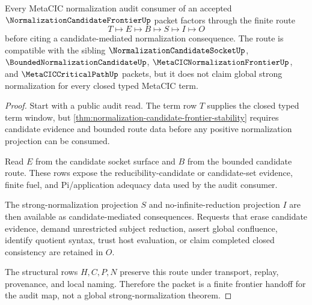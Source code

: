 \begin{theorem}
\label{thm:normalization-candidate-frontier-audit-handoff}
Every MetaCIC normalization audit consumer of an accepted $\NormalizationCandidateFrontierUp$ packet factors through the finite route
$$
T \longmapsto E \longmapsto B \longmapsto S \longmapsto I \longmapsto O
$$
before citing a candidate-mediated normalization consequence. The route is compatible with the sibling $\NormalizationCandidateSocketUp$, $\BoundedNormalizationCandidateUp$, $\MetaCICNormalizationFrontierUp$, and $\MetaCICCriticalPathUp$ packets, but it does not claim global strong normalization for every closed typed MetaCIC term.
\end{theorem}
\begin{proof}
Start with a public audit read. The term row $T$ supplies the closed typed term window, but \autoref{thm:normalization-candidate-frontier-stability} requires candidate evidence and bounded route data before any positive normalization projection can be consumed.

Read $E$ from the candidate socket surface and $B$ from the bounded candidate route. These rows expose the reducibility-candidate or candidate-set evidence, finite fuel, and Pi/application adequacy data used by the audit consumer.

The strong-normalization projection $S$ and no-infinite-reduction projection $I$ are then available as candidate-mediated consequences. Requests that erase candidate evidence, demand unrestricted subject reduction, assert global confluence, identify quotient syntax, trust host evaluation, or claim completed closed consistency are retained in $O$.

The structural rows $H,C,P,N$ preserve this route under transport, replay, provenance, and local naming. Therefore the packet is a finite frontier handoff for the audit map, not a global strong-normalization theorem.
\end{proof}

